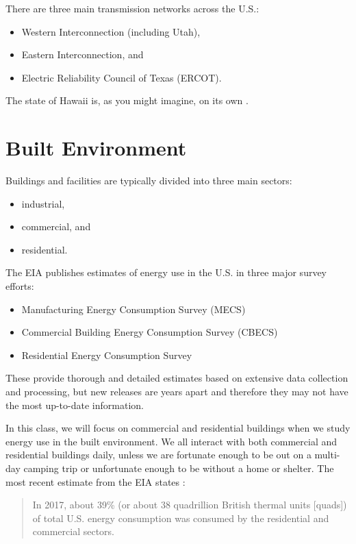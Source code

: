 \documentclass[10pt]{article}
\begin{document}
There are three main transmission networks across the U.S.: \begin{itemize}
\item Western Interconnection (including Utah),
\item Eastern Interconnection, and
\item Electric Reliability Council of Texas (ERCOT).
\end{itemize}

The state of Hawaii is, as you might imagine, on its own \cite{noauthor_undated-wl}.

\section{Built Environment}

Buildings and facilities are typically divided into three main sectors: 

\begin{itemize}
    \item industrial, 
    \item commercial, and
    \item residential.
\end{itemize}

The EIA publishes estimates of energy use in the U.S. in three major survey efforts:

\begin{itemize}
    \item Manufacturing Energy Consumption Survey (MECS) \cite{noauthor_undated-dy}
    \item Commercial Building Energy Consumption Survey (CBECS) \cite{noauthor_undated-va}
    \item Residential Energy Consumption Survey \cite{noauthor_undated-wv}
\end{itemize}

These provide thorough and detailed estimates based on extensive data collection and processing, but new releases are years apart and therefore they may not have the most up-to-date information.

In this class, we will focus on commercial and residential buildings when we study energy use in the built environment. We all interact with both commercial and residential buildings daily, unless we are fortunate enough to be out on a multi-day camping trip or unfortunate enough to be without a home or shelter.
The most recent estimate from the EIA states \cite{noauthor_undated-ow}:

\begin{quote}
    In 2017, about 39\% (or about 38 quadrillion British thermal units [quads]) of total U.S. energy consumption was consumed by the residential and commercial sectors. 
\end{quote}
\end{document}
